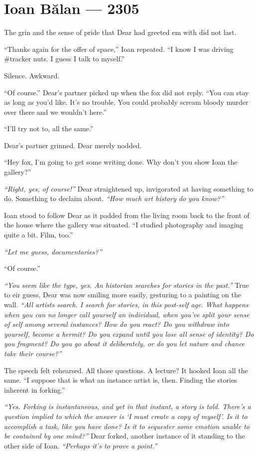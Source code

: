 \hypertarget{ioan-bux103lan-2305}{%
\chapter*{Ioan Bălan — 2305}\label{ioan-bux103lan-2305}}

The grin and the sense of pride that Dear had greeted em with did not last.

``Thanks again for the offer of space,'' Ioan repeated. ``I know I was driving \#tracker nuts. I guess I talk to myself.''

Silence. Awkward.

``Of course.'' Dear's partner picked up when the fox did not reply. ``You can stay as long as you'd like. It's no trouble. You could probably scream bloody murder over there and we wouldn't here.''

``I'll try not to, all the same.''

Dear's partner grinned. Dear merely nodded.

``Hey fox, I'm going to get some writing done. Why don't you show Ioan the gallery?''

\emph{``Right, yes, of course!''} Dear straightened up, invigorated at having something to do. Something to declaim about. \emph{``How much art history do you know?''}

Ioan stood to follow Dear as it padded from the living room back to the front of the house where the gallery was situated. ``I studied photography and imaging quite a bit. Film, too.''

\emph{``Let me guess, documentaries?''}

``Of course.''

\emph{``You seem like the type, yes. An historian searches for stories in the past.''} True to eir guess, Dear was now smiling more easily, gesturing to a painting on the wall. \emph{``All artists search. I search for stories, in this post-self age. What happens when you can no longer call yourself an individual, when you've split your sense of self among several instances? How do you react? Do you withdraw into yourself, become a hermit? Do you expand until you lose all sense of identity? Do you fragment? Do you go about it deliberately, or do you let nature and chance take their course?''}

The speech felt rehearsed. All those questions. A lecture? It hooked Ioan all the same. ``I suppose that is what an instance artist is, then. Finding the stories inherent in forking.''

\emph{``Yes. Forking is instantaneous, and yet in that instant, a story is told. There's a question implied to which the answer is `I must create a copy of myself'. Is it to accomplish a task, like you have done? Is it to sequester some emotion unable to be contained by one mind?''} Dear forked, another instance of it standing to the other side of Ioan. \emph{``Perhaps it's to prove a point.''}

